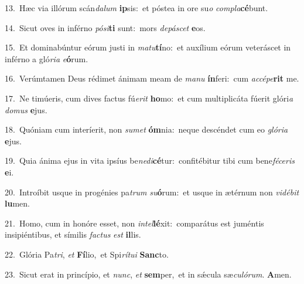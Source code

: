 {\numbfont\textcolor{\numbcolor}{13.}}~Hæc via illórum scán\-\textit{da}\-\textit{lum} \textbf{ip}\-sis:~\star et póstea in ore su\textit{o} \textit{com}\-\textit{pla}\textbf{cé}bunt.\par
{\numbfont\textcolor{\numbcolor}{14.}}~Sicut oves in inférno \textit{pó}\-\textit{si}\textbf{ti} sunt:~\star mors \textit{de}\-\textit{pá}\textit{scet} \textbf{e}\-os.\par
{\numbfont\textcolor{\numbcolor}{15.}}~Et dominabúntur eórum justi in \textit{ma}\-\textit{tu}\textbf{tí}no:~\star et auxílium eórum veteráscet in inférno a gló\-\textit{ri}\-\textit{a} \textit{e}\-\textbf{ó}rum.\par
{\numbfont\textcolor{\numbcolor}{16.}}~Verúmtamen Deus rédimet ánimam meam de \textit{ma}\-\textit{nu} \textbf{ín}\-feri:~\star cum \textit{ac}\-\textit{cé}\textit{pe}\textbf{rit} me.\par
{\numbfont\textcolor{\numbcolor}{17.}}~Ne timúeris, cum dives factus fú\-\textit{e}\-\textit{rit} \textbf{ho}\-mo:~\star et cum multiplicáta fúerit glóri\textit{a} \textit{do}\-\textit{mus} \textbf{e}\-jus.\par
{\numbfont\textcolor{\numbcolor}{18.}}~Quóniam cum interíerit, non \textit{su}\-\textit{met} \textbf{óm}\-nia:~\star neque descéndet cum eo \textit{gló}\-\textit{ri}\textit{a} \textbf{e}\-jus.\par
{\numbfont\textcolor{\numbcolor}{19.}}~Quia ánima ejus in vita ipsíus be\-\textit{ne}\-\textit{di}\textbf{cé}tur:~\star confitébitur tibi cum bene\-\textit{fé}\-\textit{ce}\textit{ris} \textbf{e}\-i.\par
{\numbfont\textcolor{\numbcolor}{20.}}~Introíbit usque in progénies pa\textit{trum} \textit{su}\-\textbf{ó}rum:~\star et usque in ætérnum non \textit{vi}\-\textit{dé}\textit{bit} \textbf{lu}\-men.\par
{\numbfont\textcolor{\numbcolor}{21.}}~Homo, cum in honóre esset, non \textit{in}\-\textit{tel}\textbf{lé}xit:~\star comparátus est juméntis insipiéntibus, et símilis \textit{fac}\-\textit{tus} \textit{est} \textbf{il}\-lis.\par
{\numbfont\textcolor{\numbcolor}{22.}}~Glória Pa\-\textit{tri}\-, \textit{et} \textbf{Fí}\-lio,~\star et Spi\-\textit{rí}\-\textit{tu}\textit{i} \textbf{Sanc}\-to.\par
{\numbfont\textcolor{\numbcolor}{23.}}~Sicut erat in princípio, et \textit{nunc}\-, \textit{et} \textbf{sem}\-per,~\star et in sǽcula sæ\-\textit{cu}\-\textit{ló}\textit{rum}. \textbf{A}\-men.\par
